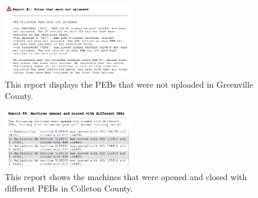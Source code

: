 \begin{figure}[h!]
  \caption{This report displays the PEBs that were not uploaded in Greenville County.}
  \label{fig:sample2}
  \centering
    \includegraphics[width=0.5\textwidth]{sample3}
\end{figure}

\begin{figure}[h!]
  \caption{This report shows the machines that were opened and closed with different PEBs in Colleton County.}
  \label{fig:sample3}
  \centering
    \includegraphics[width=0.5\textwidth]{sample2}
\end{figure}
